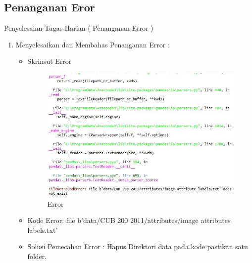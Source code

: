 \par
\par
\subsection{Penanganan Eror}
Penyelesaian Tugas Harian  ( Penanganan Error )
\begin{enumerate}
\item Menyelesaikan dan Membahas Penanganan Error :
\begin{itemize}
\item Skrinsut Error

\begin{figure}[ht]
\centering
\includegraphics[scale=0.7]{figures/AFS/Error.jpg}
\caption{Error}
\label{contoh}
\end{figure}
\end{itemize}

\begin{itemize}
\item Kode Error: file b'data/CUB 200 2011/attributes/image attributes labels.txt'
\par 
\item Solusi Pemecahan Error : Hapus Direktori data pada kode pastikan satu folder.
\par 
\par
\end{itemize}
\end{enumerate}
